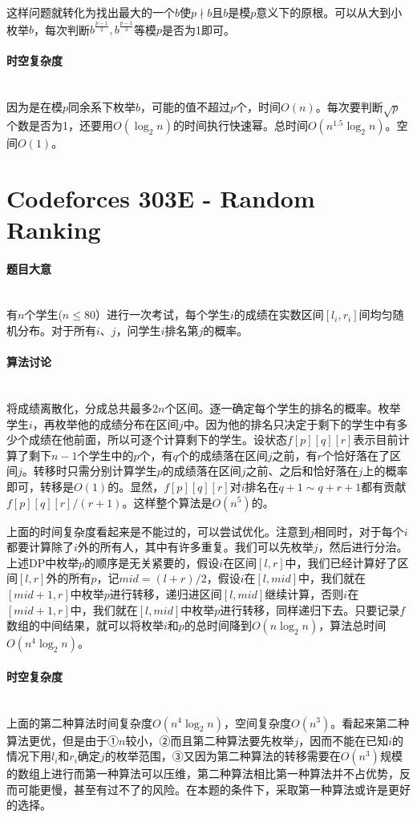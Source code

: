 \documentclass[UTF8]{ctexart}
\newcommand{\myparagraph}[1]{\paragraph{#1}\mbox{}\\}
\theoremstyle{nonumberplain}
\begin{document}
			这样问题就转化为找出最大的一个$b$使$p \nmid b$且$b$是模$p$意义下的原根。可以从大到小枚举$b$，每次判断$b^{\frac{p-1}{2}}, b^{\frac{p-1}{3}}$等模$p$是否为1即可。
		
		\myparagraph{时空复杂度}
		
			因为是在模$p$同余系下枚举$b$，可能的值不超过$p$个，时间$O(n)$。每次要判断$\sqrt{p}$个数是否为1，还要用$O(\log_2n)$的时间执行快速幂。总时间$O(n^{1.5} \log_2n)$。空间$O(1)$。
	
	\section{Codeforces 303E - Random Ranking}
	
		\myparagraph{题目大意}
		
			有$n$个学生($n \leq 80$）进行一次考试，每个学生$i$的成绩在实数区间$[l_i,r_i]$间均匀随机分布。对于所有$i$、$j$，问学生$i$排名第$j$的概率。
		
		\myparagraph{算法讨论}
		
			将成绩离散化，分成总共最多$2n$个区间。逐一确定每个学生的排名的概率。枚举学生$i$，再枚举他的成绩分布在区间$j$中。因为他的排名只决定于剩下的学生中有多少个成绩在他前面，所以可逐个计算剩下的学生。设状态$f[p][q][r]$表示目前计算了剩下$n-1$个学生中的$p$个，有$q$个的成绩落在区间$j$之前，有$r$个恰好落在了区间$j$。转移时只需分别计算学生$p$的成绩落在区间$j$之前、之后和恰好落在$j$上的概率即可，转移是$O(1)$的。显然，$f[p][q][r]$对$i$排名在$q+1 \sim q+r+1$都有贡献$f[p][q][r]/(r+1)$。这样整个算法是$O(n^5)$的。
			
			上面的时间复杂度看起来是不能过的，可以尝试优化。注意到$j$相同时，对于每个$i$都要计算除了$i$外的所有人，其中有许多重复。我们可以先枚举$j$，然后进行分治。上述DP中枚举$p$的顺序是无关紧要的，假设$i$在区间$[l,r]$中，我们已经计算好了区间$[l,r]$外的所有$p$，记$mid=(l+r)/2$，假设$i$在$[l,mid]$中，我们就在$[mid+1,r]$中枚举$p$进行转移，递归进区间$[l,mid]$继续计算，否则$i$在$[mid+1,r]$中，我们就在$[l,mid]$中枚举$p$进行转移，同样递归下去。只要记录$f$数组的中间结果，就可以将枚举$i$和$p$的总时间降到$O(n\log_2n)$，算法总时间$O(n^4\log_2n)$。
		
		\myparagraph{时空复杂度}
		
			上面的第二种算法时间复杂度$O(n^4\log_2n)$，空间复杂度$O(n^3)$。看起来第二种算法更优，但是由于①$n$较小，②而且第二种算法要先枚举$j$，因而不能在已知$i$的情况下用$l_i$和$r_i$确定$j$的枚举范围，③又因为第二种算法的转移需要在$O(n^3)$规模的数组上进行而第一种算法可以压维，第二种算法相比第一种算法并不占优势，反而可能更慢，甚至有过不了的风险。在本题的条件下，采取第一种算法或许是更好的选择。
	
\end{document}
